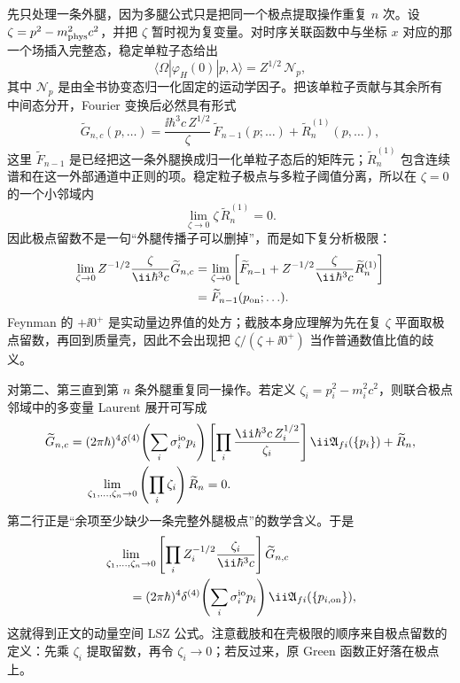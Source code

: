 \begin{derivation}
先只处理一条外腿，因为多腿公式只是把同一个极点提取操作重复 $n$ 次。设 $\zeta=p^2-m_{\rm phys}^2c^2$，并把 $\zeta$ 暂时视为复变量。对时序关联函数中与坐标 $x$ 对应的那一个场插入完整态，稳定单粒子态给出
\begin{equation*}
 \langle\Omega|\varphi_H(0)|p,\lambda\rangle
 =Z^{1/2}\,\mathcal N_p,
\end{equation*}
其中 $\mathcal N_p$ 是由全书协变态归一化固定的运动学因子。把该单粒子贡献与其余所有中间态分开，Fourier 变换后必然具有形式
\begin{equation*}
 \widetilde G_{n,c}(p,\ldots)
 =\frac{\ii\hbar^3c\,Z^{1/2}}
 {\zeta}\,
 \widetilde F_{n-1}(p;\ldots)
 +\widetilde R^{(1)}_n(p,\ldots),
\end{equation*}
这里 $\widetilde F_{n-1}$ 是已经把这一条外腿换成归一化单粒子态后的矩阵元；$\widetilde R^{(1)}_n$ 包含连续谱和在这一外部通道中正则的项。稳定粒子极点与多粒子阈值分离，所以在 $\zeta=0$ 的一个小邻域内
\begin{equation*}
 \lim_{\zeta\to0}\zeta\,\widetilde R^{(1)}_n=0.
\end{equation*}
因此极点留数不是一句“外腿传播子可以删掉”，而是如下复分析极限：
\begin{align*}
 \lim_{\zeta\to0}
 Z^{-1/2}\frac{\zeta}{\ii\hbar^3c}
 \widetilde G_{n,c}
 &=\lim_{\zeta\to0}
 \left[
 \widetilde F_{n-1}
 +Z^{-1/2}\frac{\zeta}{\ii\hbar^3c}
 \widetilde R^{(1)}_n
 \right]\\
 &=\widetilde F_{n-1}(p_{\rm on};\ldots).
\end{align*}
Feynman 的 $+\ii0^+$ 是实动量边界值的处方；截肢本身应理解为先在复 $\zeta$ 平面取极点留数，再回到质量壳，因此不会出现把 $\zeta/(\zeta+\ii0^+)$ 当作普通数值比值的歧义。

对第二、第三直到第 $n$ 条外腿重复同一操作。若定义 $\zeta_i=p_i^2-m_i^2c^2$，则联合极点邻域中的多变量 Laurent 展开可写成
\begin{align*}
 \widetilde G_{n,c}
 ={}&(2\pi\hbar)^4\delta^{(4)}\!\left(\sum_i\sigma_i^{\rm io}p_i\right)
 \left[\prod_i
 \frac{\ii\hbar^3c\,Z_i^{1/2}}{\zeta_i}\right]
 \ii\mathfrak A_{fi}(\{p_i\})
 +\widetilde R_n,\\
 &\lim_{\zeta_1,\ldots,\zeta_n\to0}
 \left(\prod_i\zeta_i\right)\widetilde R_n=0.
\end{align*}
第二行正是“余项至少缺少一条完整外腿极点”的数学含义。于是
\begin{align*}
 &\lim_{\zeta_1,\ldots,\zeta_n\to0}
 \left[\prod_iZ_i^{-1/2}
 \frac{\zeta_i}{\ii\hbar^3c}\right]
 \widetilde G_{n,c}\\
 &\qquad=(2\pi\hbar)^4\delta^{(4)}\!\left(\sum_i\sigma_i^{\rm io}p_i\right)
 \ii\mathfrak A_{fi}(\{p_{i,\rm on}\}),
\end{align*}
这就得到正文的动量空间 LSZ 公式。注意截肢和在壳极限的顺序来自极点留数的定义：先乘 $\zeta_i$ 提取留数，再令 $\zeta_i\to0$；若反过来，原 Green 函数正好落在极点上。


\end{derivation}
